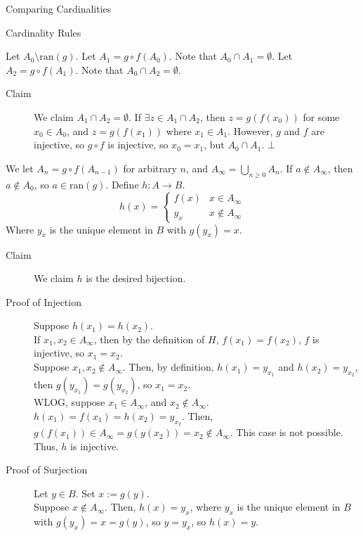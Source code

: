 \documentclass[10pt]{extarticle}
\begin{document}
\begin{problem}{Comparing Cardinalities}
\begin{problem}{Cardinality Rules}
\begin{description}
          Let $A_0 \setminus \textrm{ran}(g)$. Let $A_1 = g\circ f(A_0)$. Note that $A_0 \cap A_1 = \emptyset$. Let $A_2 = g\circ f(A_1)$. Note that $A_0\cap A_2 =\emptyset$.
          \begin{description}
            \item[Claim] We claim $A_1 \cap A_2 = \emptyset$. If $\exists z\in A_1\cap A_2$, then $z = g(f(x_0))$ for some $x_0 \in A_0$, and $z = g(f(x_1))$ where $x_1\in A_1$. However, $g$ and $f$ are injective, so $g\circ f$ is injective, so $x_0 = x_1$, but $A_0\cap A_1$. $\bot$
          \end{description}
          We let $A_n = g\circ f(A_{n-1})$ for arbitrary $n$, and $A_{\infty} = \bigcup_{n\geq 0} A_n$. If $a\notin A_{\infty}$, then $a\notin A_0$, so $a\in \textrm{ran}(g)$. Define $h: A\rightarrow B$.
          \[
            h(x) = \begin{cases}
              f(x) & x\in A_{\infty}\\
              y_x & x\notin A_{\infty}
            \end{cases}
          \] 
          Where $y_x$ is the unique element in $B$ with $g(y_x) = x$.
          \begin{description}
            \item[Claim] We claim $h$ is the desired bijection.
            \item[Proof of Injection] Suppose $h(x_1) = h(x_2)$.\\

              If $x_1,x_2\in A_{\infty}$, then by the definition of $H$, $f(x_1) = f(x_2)$, $f$ is injective, so $x_1 = x_2$.\\

              Suppose $x_1,x_2\notin A_{\infty}$. Then, by definition, $h(x_1) = y_{x_1}$ and $h(x_2) = y_{x_2}$, then $g(y_{x_1}) = g(y_{x_2})$, so $x_1 = x_2$.\\

              WLOG, suppose $x_1\in A_{\infty}$, and $x_2 \notin A_{\infty}$. $h(x_1) = f(x_1) = h(x_2) = y_{x_2}$. Then, $g(f(x_1))\in A_{\infty} = g(y(x_2)) = x_2\notin A_{\infty}$. This case is not possible.\\

              Thus, $h$ is injective.
            \item[Proof of Surjection] Let $y\in B$. Set $x := g(y)$.\\

              Suppose $x\notin A_{\infty}$. Then, $h(x) = y_x$, where $y_x$ is the unique element in $B$ with $g(y_x)=x=g(y)$, so $y = y_x$, so $h(x) = y$.\\


\end{description}
\end{description}
\end{problem}
\end{problem}
\end{document}
